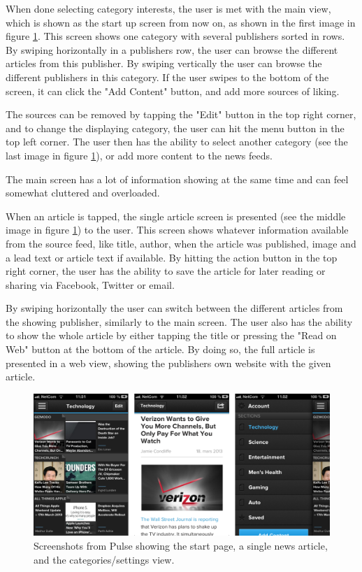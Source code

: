 When done selecting category interests, the user is met with the main view, which is shown as the start up screen from now on, as shown in the first image in figure \ref{screenshots_pulse}. This screen shows one category with several publishers sorted in rows. By swiping horizontally in a publishers row, the user can browse the different articles from this publisher. By swiping vertically the user can browse the different publishers in this category. If the user swipes to the bottom of the screen, it can click the "Add Content" button, and add more sources of liking.

The sources can be removed by tapping the "Edit" button in the top right corner, and to change the displaying category, the user can hit the menu button in the top left corner. The user then has the ability to select another category (see the last image in figure \ref{screenshots_pulse}), or add more content to the news feeds.

The main screen has a lot of information showing at the same time and can feel somewhat cluttered and overloaded.

When an article is tapped, the single article screen is presented (see the middle image in figure \ref{screenshots_pulse}) to the user. This screen shows whatever information available from the source feed, like title, author, when the article was published, image and a lead text or article text if available. By hitting the action button in the top right corner, the user has the ability to save the article for later reading or sharing via Facebook, Twitter or email. 

By swiping horizontally the user can switch between the different articles from the showing publisher, similarly to the main screen. The user also has the ability to show the whole article by either tapping the title or pressing the "Read on Web" button at the bottom of the article. By doing so, the full article is presented in a web view, showing the publishers own website with the given article.

\begin{figure}[!htbp]
\centering
\includegraphics[width=130mm]{GFX/screenshots/pulse.png}
\caption{Screenshots from Pulse showing the start page, a single news article, and the categories/settings view.}
\label{screenshots_pulse}
\end{figure}

